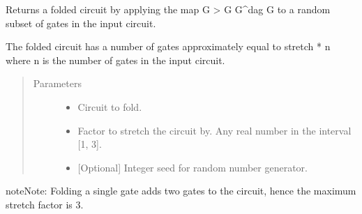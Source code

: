 \documentclass[letterpaper,10pt,english]{sphinxmanual}
\begin{document}

\begin{fulllineitems}
\label{\detokenize{index:mitiq.folding_cirq.fold_gates_at_random}}
Returns a folded circuit by applying the map G \sphinxhyphen{}\textgreater{} G G\textasciicircum{}dag G to a random subset of gates in the input circuit.

The folded circuit has a number of gates approximately equal to stretch * n where n is the number of gates in
the input circuit.
\begin{quote}\begin{description}
\item[{Parameters}] \leavevmode\begin{itemize}
\item {} 
 \sphinxhyphen{}\sphinxhyphen{} Circuit to fold.

\item {} 
 \sphinxhyphen{}\sphinxhyphen{} Factor to stretch the circuit by. Any real number in the interval {[}1, 3{]}.

\item {} 
 \sphinxhyphen{}\sphinxhyphen{} {[}Optional{]} Integer seed for random number generator.

\end{itemize}

\end{description}\end{quote}

\begin{sphinxadmonition}{note}{Note:}
Folding a single gate adds two gates to the circuit, hence the maximum stretch factor is 3.
\end{sphinxadmonition}

\end{fulllineitems}

\end{document}
